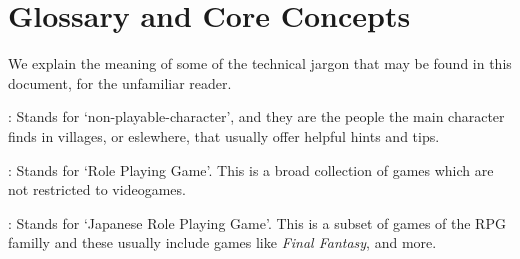 \section{Glossary and Core Concepts}

We explain the meaning of some of the technical jargon that may be found in this
document, for the unfamiliar reader.

\begin{description}

: Stands for `non-playable-character', and they are the people the
  main character finds in villages, or eslewhere, that usually offer helpful
  hints and tips.

: Stands for `Role Playing Game'. This is a broad collection of
  games which are not restricted to videogames.

: Stands for `Japanese Role Playing Game'. This is a subset of
  games of the RPG familly and these usually include games like \textit{Final
  Fantasy}, and more.

\end{description}

